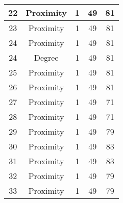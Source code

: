 \documentclass[results.tex]{subfiles}
\begin{document}
\begin{center}
\begin{tabular}{| c || c | c | c | c |}
            \hline
            22                      & Proximity                    & 1                      & 49                      & 81                   \\
            \hline
            23                      & Proximity                    & 1                      & 49                      & 81                   \\
            \hline
            24                      & Proximity                    & 1                      & 49                      & 81                   \\
            \hline
            24                      & Degree                       & 1                      & 49                      & 81                   \\
            \hline
            25                      & Proximity                    & 1                      & 49                      & 81                   \\
            \hline
            26                      & Proximity                    & 1                      & 49                      & 81                   \\
            \hline
            27                      & Proximity                    & 1                      & 49                      & 71                   \\
            \hline
            28                      & Proximity                    & 1                      & 49                      & 71                   \\
            \hline
            29                      & Proximity                    & 1                      & 49                      & 79                   \\
            \hline
            30                      & Proximity                    & 1                      & 49                      & 83                   \\
            \hline
            31                      & Proximity                    & 1                      & 49                      & 83                   \\
            \hline
            32                      & Proximity                    & 1                      & 49                      & 79                   \\
            \hline
            33                      & Proximity                    & 1                      & 49                      & 79                   \\

\end{tabular}
\end{center}
\end{document}
